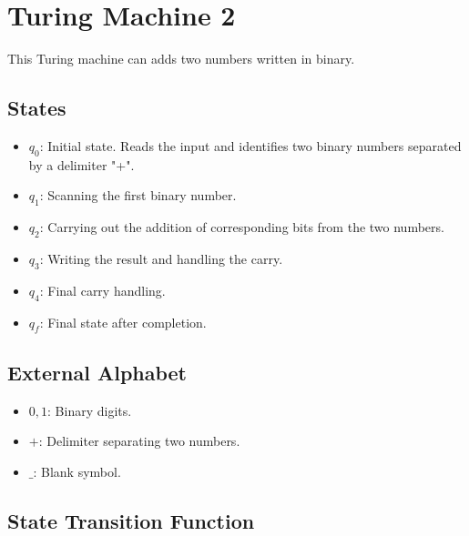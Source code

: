 \documentclass[a4paper]{article}
\begin{document}
\section{Turing Machine 2}
This Turing machine can adds two numbers written in binary. 
\subsection{States}
\begin{itemize}
    \item $q_0$: Initial state. Reads the input and identifies two binary numbers separated by a delimiter "+". 
    \item $q_1$: Scanning the first binary number. 
    \item $q_2$: Carrying out the addition of corresponding bits from the two numbers.
    \item $q_3$: Writing the result and handling the carry.
    \item $q_4$: Final carry handling.
    \item $q_f$: Final state after completion.
\end{itemize}

\subsection{External Alphabet}
\begin{itemize}
    \item $0, 1$: Binary digits.
    \item $+$: Delimiter separating two numbers.
    \item $\_ $: Blank symbol.
\end{itemize}

\subsection{State Transition Function}
\end{document}
